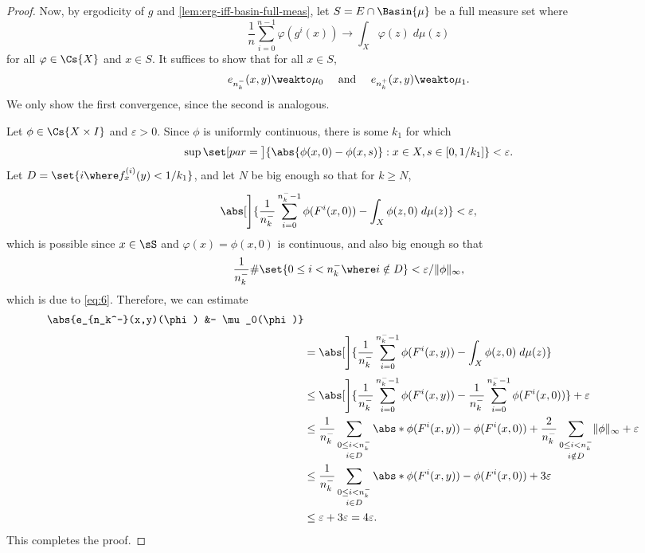 \documentclass[../main]{subfiles}
\begin{document}
\begin{proof}
  Now, by ergodicity of \(g\) and \cref{lem:erg-iff-basin-full-meas}, let \(S = E \cap \Basin{\mu}\) be a full measure set where
  \begin{equation*}
    \frac{1}{n} \sum_{i = 0}^{n - 1}\varphi(g^i(x)) \to \int_X \varphi(z) \;d\mu(z)
  \end{equation*}
  for all \(\varphi \in \Cs{X}\) and \(x \in S\).
  It suffices to show that for all \(x \in S\),
  \[e_{n^-_k}(x,y) \weakto \mu_0 \quad\text{ and }\quad e_{n^+_k}(x,y) \weakto \mu_1.\]
  We only show the first convergence, since the second is analogous.

  Let \(\phi \in \Cs{X \times I}\) and \(\varepsilon > 0\). Since \(\phi\) is uniformly continuous, there is some \(k_1\) for which
  \begin{equation*}
    \sup\set[par = \big]{\abs{\phi(x,0) - \phi(x, s)} : x \in X, s \in [0,1/k_1]} < \varepsilon.
  \end{equation*}
  Let \(D = \set{i \where f^{(i)}_x(y) < 1/k_1}\), and let \(N\) be big enough so that for \(k \geq N\),
  \begin{equation*}
    \abs[\Bigg]{\frac{1}{n_k^-} \sum_{i = 0}^{n_k^- - 1}\phi(F^i(x,0)) - \int_X \phi(z,0) \;d\mu(z)} < \varepsilon,
  \end{equation*}
  which is possible since \(x \in \sS\) and \(\varphi(x) = \phi(x,0)\) is continuous, and also big enough so that
  \[\frac{1}{n_k^-}\# \set{ 0 \leq i < n_k^- \where i \notin D } < \varepsilon / \lVert \phi \rVert_{\infty},\]
  which is due to \cref{eq:6}. Therefore, we can estimate
  \begin{align*}
    \abs{e_{n_k^-}(x,y)(\phi) &- \mu_0(\phi)}\\
    &=
    \abs[\Bigg]{
    \frac{1}{n_k^-}\sum_{i = 0}^{n_k^- - 1} \phi(F^i(x,y))
      -
      \int_X \phi(z,0) \;d\mu(z)
      }\\
    &\leq
      \abs[\Bigg]{
      \frac{1}{n_k^-}\sum_{i = 0}^{n_k^- - 1} \phi(F^i(x,y))
      -
        \frac{1}{n_k^-}\sum_{i = 0}^{n_k^- - 1} \phi(F^i(x,0))
      } + \varepsilon
    \\
    &\le
      \frac{1}{n^-_k}
      \sum_{\substack{0 \leq i < n_k^- \\[1pt] i \in D}}
    \abs*{\phi(F^i(x,y)) - \phi(F^i(x,0))}
    +  \frac{2}{n^-_k}\sum_{\substack{0 \leq i < n^-_k \\[1pt] i \notin D}} \lVert \phi \rVert_{\infty} + \varepsilon\\
    &\le
      \frac{1}{n^-_k}
      \sum_{\substack{0 \leq i < n_k^- \\[1pt] i \in D}}
    \abs*{\phi(F^i(x,y)) - \phi(F^i(x,0))} + 3\varepsilon\\
    &\leq \varepsilon + 3\varepsilon = 4\varepsilon.
  \end{align*}
  This completes the proof.
\end{proof}
\end{document}
